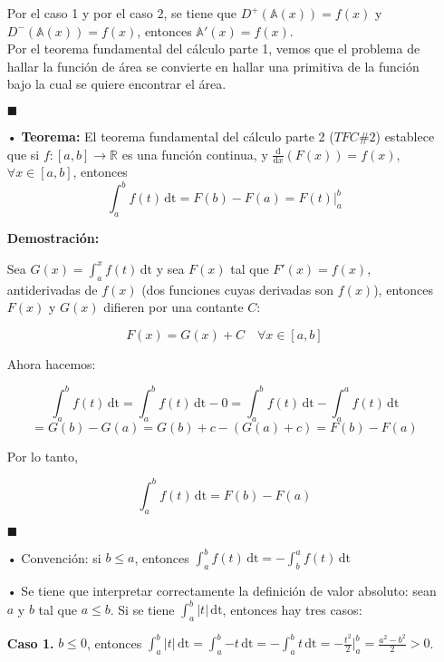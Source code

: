 \documentclass[pts12]{article}
\numberwithin{equation}{section}
\newcommand{\Col}{\color{ProcessBlue}}
\newcommand{\derivate}[2]{\frac{\mathrm{d}}{\mathrm{d}#1} \left(  {#2}  \right)  }
\begin{document}
\begin{itemize}
Por el caso 1 y por el caso 2, se tiene que $D^+(\mathbb{A}(x))=f(x)$ y $D^-(\mathbb{A}(x))=f(x)$, entonces $\mathbb{A}'(x)=f(x)$. \\

Por el teorema fundamental del cálculo parte 1, vemos que el problema de hallar la función de área se convierte en hallar una primitiva de la función bajo la cual se quiere encontrar el área. 

\begin{flushright}
$\blacksquare$
\end{flushright}	

\item[\Col •] \textbf{Teorema:} El teorema fundamental del cálculo parte 2 ($TFC \#2$) establece que si $f:[a,b]\longrightarrow\mathbb{R}$ es una función continua, y $\derivate{x}{F(x)}=f(x)$, $\forall x\in [a,b]$, entonces 
$$ \int_{a}^{b} \! {f(t)} \, \mathrm{dt}=F(b)-F(a)=F(t) \Big|_a^b $$ 

\textbf{Demostración:}

Sea $G(x)=\int_{a}^{x} \! {f(t)} \, \mathrm{dt}$ y sea $F(x)$ tal que $F'(x)=f(x)$, antiderivadas de $f(x)$ (dos funciones cuyas derivadas son $f(x)$), entonces $F(x)$ y $G(x)$ difieren por una contante $C$:

$$ F(x)=G(x)+C \quad \forall x\in [a,b] $$

Ahora hacemos:

$$\int_{a}^{b} \! {f(t)} \, \mathrm{dt}=\int_{a}^{b} \! {f(t)} \, \mathrm{dt}-0=\int_{a}^{b} \! {f(t)} \, \mathrm{dt}- \int_{a}^{a} \! {f(t)} \, \mathrm{dt}$$
$$=G(b)-G(a)=G(b)+c-(G(a)+c)=F(b)-F(a)$$

Por lo tanto, 

$$ \int_{a}^{b} \! {f(t)} \, \mathrm{dt}=F(b)-F(a) $$

\begin{flushright}
$\blacksquare$
\end{flushright}

\item[\Col •] Convención: si $b\leq a$, entonces $\int_{a}^{b} \! {f(t)} \, \mathrm{dt}=-\int_{b}^{a} \! {f(t)} \, \mathrm{dt}$

\item[\Col •] Se tiene que interpretar correctamente la definición de valor absoluto:  sean $a$ y $b$ tal que $a\leq b$. Si se tiene $\int_{a}^{b} \! {|t|} \, \mathrm{dt}$, entonces hay tres casos:

\textbf{Caso 1.} $b\leq 0$, entonces $\int_{a}^{b} \! {|t|} \, \mathrm{dt}=\int_{a}^{b} \! {-t} \, \mathrm{dt}=-\int_{a}^{b} \! {t} \, \mathrm{dt}=-\frac{t^2}{2}\Big|_a^b=\frac{a^2-b^2}{2}>0$.


\end{itemize}
\end{document}
